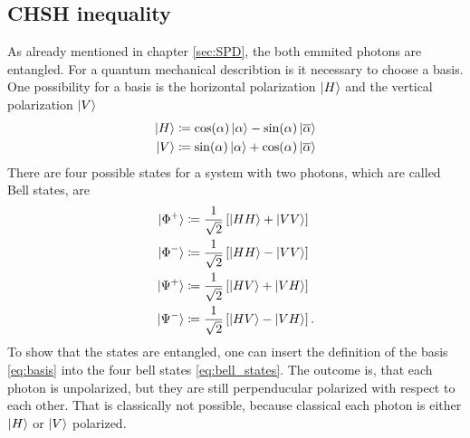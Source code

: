 \subsection{CHSH inequality}\label{sec:theory_CHSH}
As already mentioned in chapter \ref{sec:SPD}, the both emmited photons are entangled. For a quantum mechanical describtion is it necessary to choose a basis. One possibility for a basis is the horizontal polarization $\ket{H}$ and  the vertical polarization $\ket{V}$
\begin{align}
\ket{H}  & \coloneqq \mathrm{cos}(\alpha) \ket{\alpha} -  \mathrm{sin}(\alpha) \ket{\overline{\alpha}} \\
\ket{V}  & \coloneqq \mathrm{sin}(\alpha) \ket{\alpha} +  \mathrm{cos}(\alpha) \ket{\overline{\alpha}}
\label{eq:basis}
\end{align}
There are four possible states for a system with two photons, which are called Bell states, are
\begin{align}
\ket{\Phi^{+}} & \coloneqq \frac{1}{\sqrt{2}} \left[\ket{HH} + \ket{VV} \right]  \\  
\ket{\Phi^{-}} & \coloneqq \frac{1}{\sqrt{2}} \left[\ket{HH} - \ket{VV} \right]  \\
\ket{\Psi^{+}} & \coloneqq \frac{1}{\sqrt{2}} \left[\ket{HV} + \ket{VH} \right]  \\  
\ket{\Psi^{-}} & \coloneqq \frac{1}{\sqrt{2}} \left[\ket{HV} - \ket{VH} \right].   
\label{eq:bell_states}
\end{align}
To show that the states are entangled, one can insert the definition of the basis \eqref{eq:basis} into the four bell states \eqref{eq:bell_states}. The outcome is, that each photon is unpolarized, but they are still perpenducular polarized with respect to each other. 
That is classically not possible, because classical each photon is either $\ket{H}$  or $\ket{V}$ polarized. 



